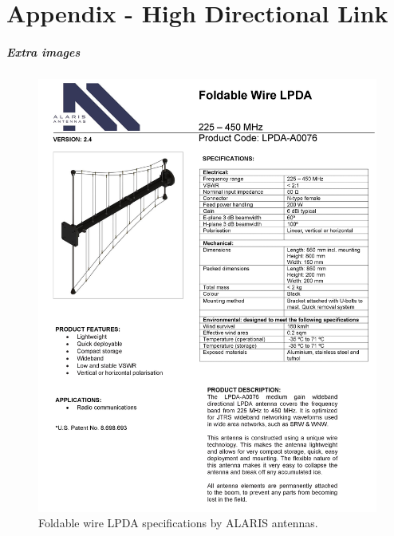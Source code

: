\chapter{Appendix - High Directional Link}

\paragraph{Extra images}
\begin{figure}[htb]
    \centering
    \includegraphics[width=1\textwidth]{figures/Yannis/LPDA.jpg}
    \caption{Foldable wire LPDA specifications by ALARIS antennas.}
    \label{LPDA1}
\end{figure}

